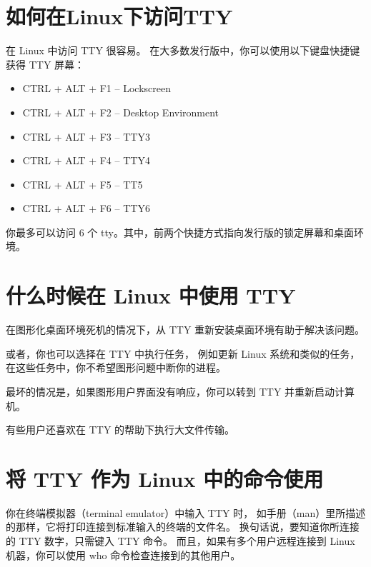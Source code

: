 \documentclass{ctexart}
\begin{document}
\clearpage
\section{如何在Linux下访问TTY}
    在 Linux 中访问 TTY 很容易。
    在大多数发行版中，你可以使用以下键盘快捷键获得 TTY 屏幕：

    \begin{itemize}[itemindent=1em]
      \item CTRL + ALT + F1 – Lockscreen
      \item CTRL + ALT + F2 – Desktop Environment
      \item CTRL + ALT + F3 – TTY3
      \item CTRL + ALT + F4 – TTY4
      \item CTRL + ALT + F5 – TT5
      \item CTRL + ALT + F6 – TTY6
    \end{itemize}

    你最多可以访问 6 个 tty。其中，前两个快捷方式指向发行版的锁定屏幕和桌面环境。

\clearpage
\section{什么时候在 Linux 中使用 TTY}
    在图形化桌面环境死机的情况下，从 TTY 重新安装桌面环境有助于解决该问题。

    或者，你也可以选择在 TTY 中执行任务，
    例如更新 Linux 系统和类似的任务，在这些任务中，你不希望图形问题中断你的进程。

    最坏的情况是，如果图形用户界面没有响应，你可以转到 TTY 并重新启动计算机。

    有些用户还喜欢在 TTY 的帮助下执行大文件传输。

\clearpage
\section{将 TTY 作为 Linux 中的命令使用}
    你在终端模拟器（terminal emulator）中输入 TTY 时，
    如手册（man）里所描述的那样，它将打印连接到标准输入的终端的文件名。
    换句话说，要知道你所连接的 TTY 数字，只需键入 TTY 命令。
    而且，如果有多个用户远程连接到 Linux 机器，你可以使用 who 命令检查连接到的其他用户。
\end{document}
